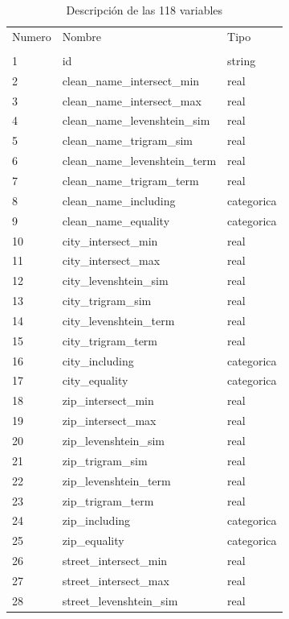 \documentclass[journal]{IEEEtran}
\begin{document}
\begin{table}[ht!]
\caption{Descripción de las 118 variables} 
\label{table:data_set}
\begin{tabular}{l | l l }
Numero & Nombre & Tipo \\
       &        &      \\
\hline
1	& id  & string  \\
2	& clean\_name\_intersect\_min  &   real  \\
3	& clean\_name\_intersect\_max  &   real  \\
4	& clean\_name\_levenshtein\_sim  &   real  \\
5	& clean\_name\_trigram\_sim  &   real  \\
6	& clean\_name\_levenshtein\_term  &   real  \\
7	& clean\_name\_trigram\_term  &   real  \\
8	& clean\_name\_including  &    categorica   \\
9	& clean\_name\_equality  &    categorica   \\
10	& city\_intersect\_min  &   real  \\
11	& city\_intersect\_max  &   real \\
12	& city\_levenshtein\_sim  &   real  \\
13	& city\_trigram\_sim  &   real  \\
14	& city\_levenshtein\_term  &   real  \\
15	& city\_trigram\_term  &   real  \\
16	& city\_including  &    categorica   \\
17	& city\_equality  &    categorica   \\
18	& zip\_intersect\_min  &   real  \\
19	& zip\_intersect\_max  &   real  \\
20	& zip\_levenshtein\_sim  &   real  \\
21	& zip\_trigram\_sim  &   real  \\
22	& zip\_levenshtein\_term  &   real  \\
23	& zip\_trigram\_term  &   real  \\
24	& zip\_including  &    categorica   \\
25	& zip\_equality  &    categorica   \\
26	& street\_intersect\_min  &   real  \\
27	& street\_intersect\_max  &   real  \\
28	& street\_levenshtein\_sim  &   real  \\

\end{tabular}
\end{table}
\end{document}
